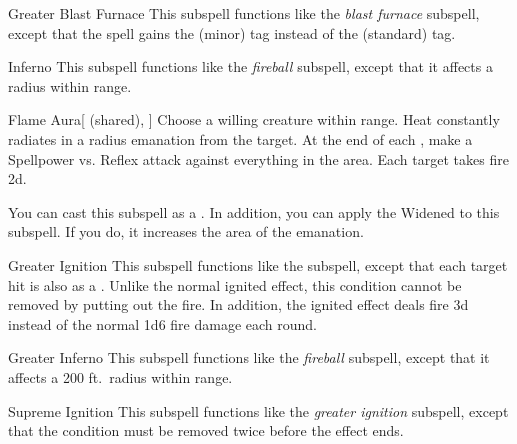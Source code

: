 \begin{ability}[\nth{5}]{Greater Blast Furnace}
This subspell functions like the \textit{blast furnace} subspell, except that the spell gains the  (minor) tag instead of the  (standard) tag.
\end{ability}
\vspace{0.25em}


\begin{ability}[\nth{5}]{Inferno}
This subspell functions like the \textit{fireball} subspell, except that it affects a \arealarge radius within \rngmed range.
\end{ability}
\vspace{0.25em}


\begin{ability}[\nth{6}]{Flame Aura}[ (shared), ]
Choose a willing creature within \rngclose range.
Heat constantly radiates in a \areamed radius emanation from the target.
At the end of each , make a Spellpower vs. Reflex attack against everything in the area.
\hit Each target takes fire  \minus2d.

You can cast this subspell as a .
In addition, you can apply the Widened  to this subspell.
If you do, it increases the area of the emanation.
\end{ability}
\vspace{0.25em}


\begin{ability}[\nth{6}]{Greater Ignition}
This subspell functions like the  subspell, except that each target hit is also  as a .
Unlike the normal ignited effect, this condition cannot be removed by putting out the fire.
In addition, the ignited effect deals fire  \minus3d instead of the normal 1d6 fire damage each round.
\end{ability}
\vspace{0.25em}


\begin{ability}[\nth{9}]{Greater Inferno}
This subspell functions like the \textit{fireball} subspell, except that it affects a 200 ft.\ radius within \rnglong range.
\end{ability}
\vspace{0.25em}


\begin{ability}[\nth{9}]{Supreme Ignition}
This subspell functions like the \textit{greater ignition} subspell, except that the condition must be removed twice before the effect ends.
\end{ability}
\vspace{0.25em}

